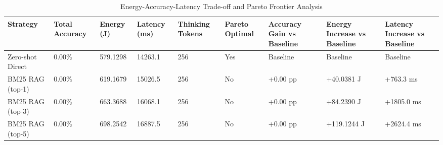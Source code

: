\begin{table}
\caption{Energy-Accuracy-Latency Trade-off and Pareto Frontier Analysis}
\label{tab:tradeoff_comparison}
\begin{tabular}{lllllllll}
\toprule
Strategy & Total Accuracy & Energy (J) & Latency (ms) & Thinking Tokens & Pareto Optimal & Accuracy Gain vs Baseline & Energy Increase vs Baseline & Latency Increase vs Baseline \\
\midrule
Zero-shot Direct & 0.00\% & 579.1298 & 14263.1 & 256 & Yes & Baseline & Baseline & Baseline \\
BM25 RAG (top-1) & 0.00\% & 619.1679 & 15026.5 & 256 & No & +0.00 pp & +40.0381 J & +763.3 ms \\
BM25 RAG (top-3) & 0.00\% & 663.3688 & 16068.1 & 256 & No & +0.00 pp & +84.2390 J & +1805.0 ms \\
BM25 RAG (top-5) & 0.00\% & 698.2542 & 16887.5 & 256 & No & +0.00 pp & +119.1244 J & +2624.4 ms \\
\bottomrule
\end{tabular}
\end{table}
